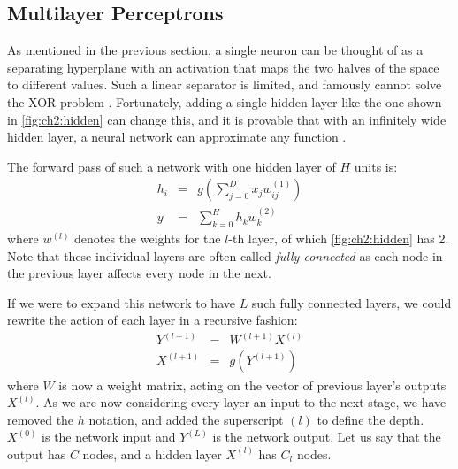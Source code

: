 \subsection{Multilayer Perceptrons}
As mentioned in the previous section, a single neuron can be thought of as a
separating hyperplane with an activation that maps the two halves of the space
to different values. Such a linear separator is limited, and famously cannot
solve the XOR problem \cite{minsky_perceptrons:_1988}. Fortunately, adding a
single hidden layer like the one shown in \autoref{fig:ch2:hidden} can change
this, and it is provable that with an infinitely wide hidden layer, a neural
network can approximate any function \cite{hornik_multilayer_1989,
cybenko_approximation_1989}. 

The forward pass of such a network with one hidden layer of $H$ units is:
%
\begin{eqnarray}
  h_i & = & g\left(\sum_{j=0}^{D} x_j w_{ij}^{(1)}\right) \\
  y & = & \sum_{k=0}^{H} h_k w^{(2)}_{k}
\end{eqnarray}
%
where $w^{(l)}$ denotes the weights for the $l$-th layer, of which
\autoref{fig:ch2:hidden} has 2. Note that these individual layers are often
called \emph{fully connected} as each node in the previous layer affects every
node in the next.

If we were to expand this network to have $L$ such fully connected layers, we
could rewrite the action of each layer in a recursive fashion:
%
\begin{eqnarray}
  Y^{(l+1)} &=& W^{(l+1)}X^{(l)} \\
  X^{(l+1)} &=& g\left(Y^{(l+1)}\right) 
\end{eqnarray}
where $W$ is now a weight matrix, acting on the vector of previous layer's
outputs $X^{(l)}$. As we are now considering every layer an input to the next
stage, we have removed the $h$ notation, and added the superscript $(l)$ to
define the depth. $X^{(0)}$ is the network input and $Y^{(L)}$ is the network
output. Let us say that the output has $C$ nodes, and a hidden layer $X^{(l)}$
has $C_l$ nodes.

\begin{figure}[t]
  \centering
  
  \label{fig:ch2:hidden}
\end{figure}

